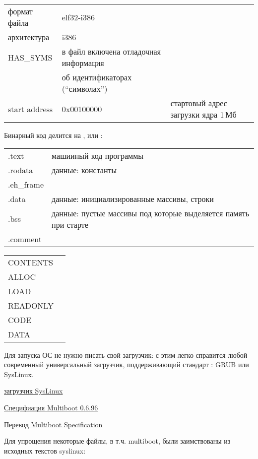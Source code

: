 \begin{tabular}{l l l}
формат файла & elf32-i386 \\
архитектура & i386 \\
HAS\_SYMS & в файл включена отладочная информация \\& об идентификаторах
(``символах'')\\
start address & 0x00100000 & стартовый адрес загрузки ядра 1\,Мб\\
\end{tabular}

\bigskip
Бинарный код делится на , или
:

\begin{tabular}{l l}
.text & машииный код программы \\
.rodata & данные: константы \\
.eh\_frame &\\
.data & данные: инициализированные массивы, строки \\
.bss & данные: пустые массивы под которые выделяется память при старте \\
.comment &\\
\end{tabular}

\bigskip
\begin{tabular}{l l}
CONTENTS & \\
ALLOC & \\
LOAD & \\
READONLY & \\
CODE & \\
DATA & \\
\end{tabular}



Для запуска ОС не нужно писать свой загрузчик: с этим легко справится любой
современный универсальный загрузчик, поддерживающий стандарт
: GRUB или SysLinux.

\bigskip
\href{http://www.syslinux.org/}{загрузчик SysLinux}

\href{http://www.gnu.org/software/grub/manual/multiboot/multiboot.html}{Специфиация
Multiboot 0.6.96}

\href{http://gownos.blogspot.ru/2011/10/multiboot-specification.html}{Перевод
Multiboot Specification}
\bigskip

Для упрощения некоторые файлы, в т.ч. multiboot, были заимствованы из исходных
текстов syslinux:


